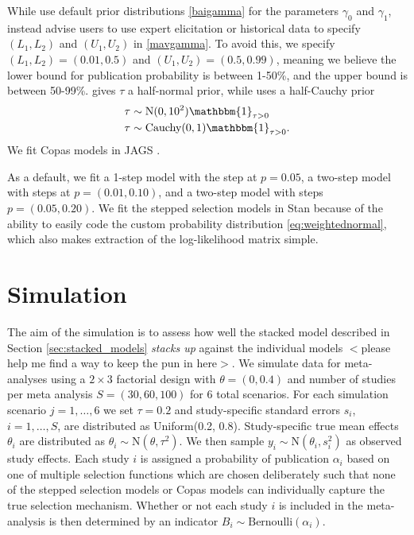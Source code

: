 \documentclass[12pt]{article}   	%
\numberwithin{equation}{section}
\begin{document}
While \citet{bai2020} use default prior distributions \eqref{baigamma} for the parameters $\gamma_0$ and $\gamma_1$, \citet{mavridis2013copas} instead advise users to use expert elicitation or historical data to specify $(L_1, L_2)$ and $(U_1, U_2)$ in \eqref{mavgamma}. To avoid this, we specify $(L_1, L_2) = (0.01, 0.5)$ and $(U_1, U_2) = (0.5, 0.99)$, meaning we believe the lower bound for publication probability is between 1-50\%, and the upper bound is between 50-99\%. \citet{mavridis2013copas} gives $\tau$ a half-normal prior, while \citet{bai2020} uses a half-Cauchy prior 
\begin{align}
\begin{split}
\tau & \sim \text{N}(0, 10^2) \mathbbm{1}_{\tau > 0} \\
\tau & \sim \text{Cauchy}(0, 1) \mathbbm{1}_{\tau > 0}.
\end{split}
\end{align}
We fit Copas models in JAGS \citep{plummer2003jags}.

As a default, we fit a 1-step model with the step at $p=0.05$, a two-step model with steps at $p = (0.01, 0.10)$, and a two-step model with steps $p = (0.05, 0.20)$. We fit the stepped selection models in Stan \citep{gelman2015stan} because of the ability to easily code the custom probability distribution \eqref{eq:weightednormal}, which also makes extraction of the log-likelihood matrix simple. 

\section{Simulation} \label{sec:simulation}

The aim of the simulation is to assess how well the stacked model described in Section \ref{sec:stacked_models} \textit{stacks up} against the individual models $<$please help me find a way to keep the pun in here$>$. We simulate data for meta-analyses using a $2\times3$ factorial design with $\theta = (0, 0.4)$ and number of studies per meta analysis $S = (30, 60, 100)$ for 6 total scenarios. For each simulation scenario $j = 1, \dots, 6$ we set $\tau = 0.2$ and study-specific standard errors $s_i$, $i = 1, \dots, S$, are distributed as Uniform(0.2, 0.8). Study-specific true mean effects $\theta_i$ are distributed as $\theta_i \sim \text{N}(\theta, \tau^2)$. We then sample $y_i \sim \text{N}(\theta_i, s_i^2)$ as observed study effects. Each study $i$ is assigned a probability of publication $\alpha_i$ based on one of multiple selection functions which are chosen deliberately such that none of the stepped selection models or Copas models can individually capture the true selection mechanism. Whether or not each study $i$ is included in the meta-analysis is then determined by an indicator $B_i \sim \text{Bernoulli}(\alpha_i)$. 
\end{document}
